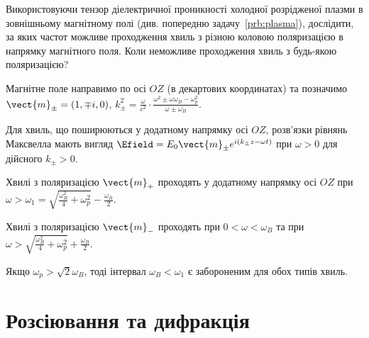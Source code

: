 \begin{problem}
    Використовуючи тензор діелектричної проникності холодної розрідженої плазми в зовнішньому магнітному полі (див.  попередню задачу~\ref{prb:plasma}), дослідити, за яких частот можливе проходження хвиль з різною коловою поляризацією в напрямку магнітного поля. Коли неможливе проходження хвиль з будь-якою поляризацією?
\begin{solution}
    Магнітне поле направимо по осі $OZ$ (в декартових координатах) та позначимо \(\vect{m}_{\pm} = (1, \mp i,0)\), \(k_\pm^2 = \frac{\omega }{c^2} \cdot \frac{\omega^2 \pm \omega \omega_B - \omega_p^2}{\omega  \pm \omega_B}\).

    Для хвиль, що поширюються у додатному напрямку осі $OZ$, розв’язки рівнянь Максвелла мають вигляд $\Efield = E_0\vect{m}_{\pm} e^{i(k_\pm z - \omega t)}$ при $\omega > 0$ для дійсного $k_{\pm} >0$.

    Хвилі з поляризацією $\vect{m}_+$ проходять у додатному напрямку осі $OZ$ при \(\omega  > \omega_1 = \sqrt {\frac{{\omega_B^2}}{4} + \omega_p^2}  - \frac{\omega _B}{2}\).

    Хвилі з поляризацією $\vect{m}_-$ проходять при \(0<\omega<\omega_B\)  та при\\\(\omega  > \sqrt {\frac{\omega_B^2}{4} + \omega_p^2}  + \frac{\omega _B}{2}\).

    Якщо \({\omega _p} > \sqrt 2 {\omega _B}\), тоді  інтервал \(\omega_B  <  \omega_1 \)  є забороненим для обох типів хвиль.
\end{solution}
\end{problem}




\section{Розсіювання та дифракція}

